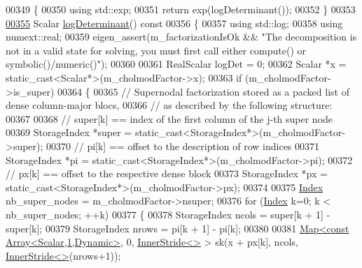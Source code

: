 \begin{DoxyCode}
00349 \textcolor{keyword}{    }\{
00350       \textcolor{keyword}{using} std::exp;
00351       \textcolor{keywordflow}{return} exp(logDeterminant());
00352     \}
00353 
\hyperlink{class_eigen_1_1_cholmod_base_a597f7839a39604af18a8741a0d8c46bf}{00355}     Scalar \hyperlink{class_eigen_1_1_cholmod_base_a597f7839a39604af18a8741a0d8c46bf}{logDeterminant}()\textcolor{keyword}{ const}
00356 \textcolor{keyword}{    }\{
00357       \textcolor{keyword}{using} std::log;
00358       \textcolor{keyword}{using} numext::real;
00359       eigen\_assert(m\_factorizationIsOk && \textcolor{stringliteral}{"The decomposition is not in a valid state for solving, you must
       first call either compute() or symbolic()/numeric()"});
00360 
00361       RealScalar logDet = 0;
00362       Scalar *x = \textcolor{keyword}{static\_cast<}Scalar*\textcolor{keyword}{>}(m\_cholmodFactor->x);
00363       \textcolor{keywordflow}{if} (m\_cholmodFactor->is\_super)
00364       \{
00365         \textcolor{comment}{// Supernodal factorization stored as a packed list of dense column-major blocs,}
00366         \textcolor{comment}{// as described by the following structure:}
00367 
00368         \textcolor{comment}{// super[k] == index of the first column of the j-th super node}
00369         StorageIndex *super = \textcolor{keyword}{static\_cast<}StorageIndex*\textcolor{keyword}{>}(m\_cholmodFactor->super);
00370         \textcolor{comment}{// pi[k] == offset to the description of row indices}
00371         StorageIndex *pi = \textcolor{keyword}{static\_cast<}StorageIndex*\textcolor{keyword}{>}(m\_cholmodFactor->pi);
00372         \textcolor{comment}{// px[k] == offset to the respective dense block}
00373         StorageIndex *px = \textcolor{keyword}{static\_cast<}StorageIndex*\textcolor{keyword}{>}(m\_cholmodFactor->px);
00374 
00375         \hyperlink{namespace_eigen_a62e77e0933482dafde8fe197d9a2cfde}{Index} nb\_super\_nodes = m\_cholmodFactor->nsuper;
00376         \textcolor{keywordflow}{for} (\hyperlink{namespace_eigen_a62e77e0933482dafde8fe197d9a2cfde}{Index} k=0; k < nb\_super\_nodes; ++k)
00377         \{
00378           StorageIndex ncols = super[k + 1] - super[k];
00379           StorageIndex nrows = pi[k + 1] - pi[k];
00380 
00381           \hyperlink{group___core___module_class_eigen_1_1_map}{Map<const Array<Scalar,1,Dynamic>}, 0, 
      \hyperlink{class_eigen_1_1_inner_stride}{InnerStride<>} > sk(x + px[k], ncols, \hyperlink{class_eigen_1_1_inner_stride}{InnerStride<>}(nrows+1));

\end{DoxyCode}
